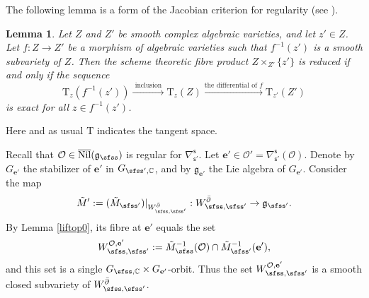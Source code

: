 \documentclass[11pt,a4paper]{amsart}
\newcommand{\CO}{{\mathcal {O}}}
\newcommand{\g}{\mathfrak g}
\newcommand{\X}{\mathbf{X}}
\def\DD{\nabla}
\newcommand{\be}{\begin {equation}}
\newcommand{\ee}{\end {equation}}
\numberwithin{equation}{section}
\newtheorem{lem}[thm]{Lemma}
\theoremstyle{remark}
\def\Nil{\overline{\mathrm{Nil}}}
\def\cOp{\cO^{\prime}}
\def\Vs{V_{\sfss}}
\def\Vsp{V_{\sfss'}}
\begin{document}
\def\Ks{{K}_{\sfss,\bC}}
\def\Ksp{{K}_{\sfss',\bC}}
\def\Kspo{{K}_{\sfss'_0,\bC}}
\def\Kspt{{K}_{\sfss'_1,\bC}}

\def\Gs{{G}_{\sfss}}
\def\Gsp{{G}_{\sfss'}}
\def\Gspo{{G}_{\sfss'_0}}
\def\Gspt{{G}_{\sfss'_1}}
\def\CMs{{\tilde M}_{\sfss}}
\def\CMsp{{\tilde M}_{\sfss'}}
\def\CMss{{\tilde M}_{\sfss,\sfss'}}
\def\Wss{{W_{\sfss,\sfss'}}}
\def\Woss{{W^{\circ}_{\sfss,\sfss'}}}
\def\CXss{\cX_{\sfss,\sfss'}}
\def\X{\bfee}
\def\Xp{{\bfee'}}
\def\Xpo{{\bfee'_0}}
\def\ww{\phi}
\def\wwo{\phi_0}
\def\sOp{\sO'}
\def\fggpsb{{\fgg^{\boxslash}_{\sfss'}}}
\def\fpppsb{{\fpp^{\boxslash}_{\sfss'}}}
\def\fpppso{\fpp_{\sfss'_0}}
\def\fpppst{\fpp_{\sfss'_1}}

\def\Vs{V_\sfss}
\def\Vsp{V_{\sfss'}}
\def\Vspp{V_{\sfss''}}
\def\Vspo{V_{\sfss'_0}}
\def\Vspt{V_{\sfss'_1}}
\def\Vspi{V_{\sfss'_i}}
\def\Wssi{W_{\sfss,\sfss'_i}}
\def\Wsso{W_{\sfss,\sfss'_0}}
\def\Wsst{W_{\sfss,\sfss'_1}}

\def\CXUO{\cX_{\sfss,\sfss'}^{\bar\partial ,\cOp}}
\def\CXOO{\cX_{\sfss,\sfss'}^{\cO ,\cOp}}


The following lemma is a form of  the Jacobian criterion for
regularity (see \cite[Theorem~2.19]{LiuAG}).
\begin{lem}\label{jacobic}
Let $Z$ and $Z'$ be smooth complex algebraic varieties, and let $z'\in Z$. Let $f: Z\rightarrow Z'$ be a morphism of algebraic varieties such that $f^{-1}(z')$ is a smooth subvariety of $Z$. Then the scheme theoretic fibre product $Z\times_{Z'} \{z'\}$ is reduced if and only if the sequence
\be\label{jc0}
  \mathrm T_z(f^{-1}(z'))\xrightarrow{\textrm{ inclusion }} \mathrm T_z(Z)\xrightarrow{\textrm{the differential of $f$}} \mathrm T_{z'}(Z')
\ee
is exact for all $z\in f^{-1}(z')$.
\end{lem}

Here and as usual $\mathrm T$ indicates the tangent space.

Recall that  $\CO\in \Nil(\g_\sfss)$ is regular for $\DD_{\mathsf s'}^{\mathsf s}$.
Let $\mathbf e'\in \CO'=\DD_{\mathsf s'}^{\mathsf s}(\CO)$. Denote by $G_{\mathbf e'}$ the stabilizer of $\mathbf e'$ in $G_{\sfss',\C}$, and by $\g_{\mathbf e'}$ the Lie algebra of $G_{\mathbf e'}$. Consider the map
\[
 \tilde M':=  (\tilde M_{\sfss'})|_{W_{\sfss, \sfss'}^{\bar \partial}} : W_{\sfss, \sfss'}^{\bar \partial}\rightarrow \g_{\sfss'}.
\]
By Lemma \ref{liftop0}, its fibre at $\mathbf e'$ equals the set
\[
W_{\sfss, \sfss'}^{\CO, \mathbf e'}:=\tilde M_{\sfss}^{-1}(\CO)\cap  \tilde M_{\sfss'}^{-1}(\mathbf e'),
\]
and this set is a single $G_{\sfss,\C}\times G_{\mathbf e'}$-orbit. Thus the set $W_{\sfss, \sfss'}^{\CO, \mathbf e'}$ is a smooth closed subvariety of $W_{\sfss, \sfss'}^{\bar \partial}$.
\end{document}
